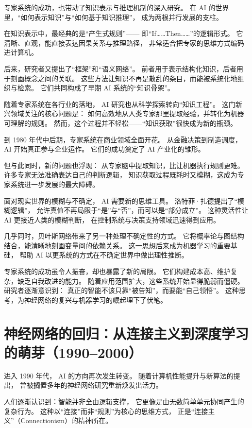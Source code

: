 专家系统的成功，也带动了知识表示与推理机制的深入研究。  
在 AI 的世界里，“如何表示知识”与“如何基于知识推理”，  
成为两根并行发展的支柱。  

在知识表示中，最经典的是“产生式规则”——  
即“If……Then……”的逻辑形式。  
它清晰、直观，能直接表达因果关系与推理路径，  
非常适合把专家的思维方式编码进计算机。  

后来，研究者又提出了“框架”和“语义网络”。  
前者用于表示结构化知识，后者用于刻画概念之间的关联。  
这些方法让知识不再是散乱的条目，而能被系统化地组织与检索。  
它们共同构成了早期 AI 系统的“知识骨架”。  

随着专家系统在各行业的落地， AI 研究也从科学探索转向“知识工程”。  
这门新兴领域关注的核心问题是：  
如何高效地从人类专家那里提取经验，并转化为机器可理解的规则。  
然而，这个过程并不轻松——“知识获取”很快成为新的瓶颈。  

到 1980 年代中后期，专家系统在商业领域全面开花。  
从金融决策到制造调度， AI 开始真正参与企业运作。  
它们的成功奠定了 AI 产业化的雏形。  

但与此同时，新的问题也浮现：  
从专家脑中提取知识，比让机器执行规则更难。  
许多专家无法准确表达自己的判断逻辑，  
知识获取过程既耗时又模糊，这成为专家系统进一步发展的最大障碍。  

面对现实世界的模糊与不确定， AI 需要新的思维工具。  
洛特菲·扎德提出了“模糊逻辑”，  
允许真值不再局限于“是”与“否”，而可以是“部分成立”。  
这种灵活性让 AI 更接近人类的模糊判断，  
在控制系统与决策支持领域迅速得到应用。  

几乎同时，贝叶斯网络带来了另一种处理不确定性的方式。  
它将概率论与图结构结合，能清晰地刻画变量间的依赖关系。  
这一思想后来成为机器学习的重要基础，  
帮助 AI 以更系统的方式在不确定世界中做出理性推断。  

专家系统的成功虽令人振奋，却也暴露了新的局限。  
它们构建成本高、维护复杂，缺乏自我改进的能力。  
随着应用范围扩大，这些系统开始显得脆弱而僵硬。  
研究者逐渐意识到：  
真正的智能不该只靠“被告知”，而要能“自己领悟”。  
这种思考，为神经网络的复兴与机器学习的崛起埋下了伏笔。  

\section{神经网络的回归：从连接主义到深度学习的萌芽（1990–2000）}

进入 1990 年代， AI 的方向再次发生转变。  
随着计算机性能提升与新算法的提出，  
曾被搁置多年的神经网络研究重新焕发出活力。  

人们逐渐认识到：智能并非全由逻辑支撑，  
它更像是由无数简单单元协同产生的复杂行为。  
这种以“连接”而非“规则”为核心的思维方式，  
正是“连接主义”（Connectionism）的精神所在。  

